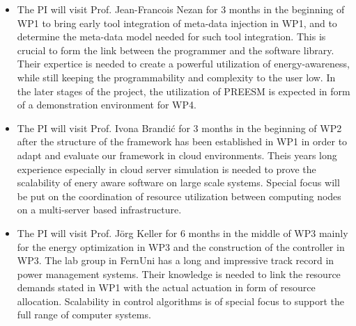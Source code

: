 \documentclass{article}
\begin{document}
\begin{itemize}
 \item The PI will visit Prof. Jean-Francois Nezan for 3 months in the beginning of WP1 to bring early tool integration of meta-data injection in WP1, and to determine the meta-data model needed for such tool integration. This is crucial to form the link between the programmer and the software library. Their expertice is needed to create a powerful utilization of energy-awareness, while still keeping the programmability and complexity to the user low.
 In the later stages of the project, the utilization of PREESM is expected in form of a demonstration environment for WP4.
 \item The PI will visit Prof. Ivona Brandi\'{c} for 3 months in the beginning of WP2 after the structure of the framework has been established in WP1 in order to adapt and evaluate our framework in cloud environments. Theis years long experience especially in cloud server simulation is needed to prove the scalability of enery aware software on large scale systems. 
 Special focus will be put on the coordination of resource utilization between computing nodes on a multi-server based infrastructure.
 \item The PI will visit Prof. J\"{o}rg Keller for 6 months in the middle of WP3 mainly for the energy optimization in WP3 and the construction of the controller in WP3.
 The lab group in FernUni has a long and impressive track record in power management systems. 
 Their knowledge is needed to link the resource demands stated in WP1 with the actual actuation in form of resource allocation.
 Scalability in control algorithms is of special focus to support the full range of computer systems.
\end{itemize}


{\footnotesize
}

\end{document}

